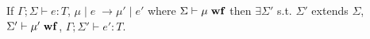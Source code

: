 \documentclass{llncs}
\numberwithin{subcase}{case}
\numberwithin{case}{theorem}
\numberwithin{case}{lemma}
\begin{document}
\begin{theorem}[Preservation]
If $\Gamma; \Sigma \vdash e : T$, 
   	$\mu \; | \; e \; \rightarrow \mu' \; | \; e'$ where
	$\Sigma \vdash \mu \; \tt{\bf{wf}}$ then 
 	$\exists \Sigma'$ s.t. 
	$\Sigma'$ extends $\Sigma$, 
	$\Sigma' \vdash \mu' \; \tt{\bf{wf}}$, 
	$\Gamma; \Sigma' \vdash e' : T$.
\end{theorem}
\end{document}
